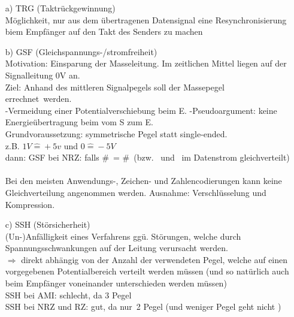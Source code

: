 \documentclass[10pt,a4paper]{scrartcl}
\begin{document}
\begin{enumerate}
	\item[a)] TRG (Taktrückgewinnung)\\
		Möglichkeit, nur aus dem übertragenen Datensignal eine Resynchronisierung biem Empfänger auf den Takt des Senders zu machen
	
	\item[b)] GSF (Gleichspannungs-/stromfreiheit)\\
		Motivation: Einsparung der Masseleitung. Im zeitlichen Mittel liegen auf der Signalleitung 0V an.\\
		Ziel: Anhand des mittleren Signalpegels soll der Massepegel \glqq errechnet\grqq\ werden.\\
		\subitem -Vermeidung einer Potentialverschiebung beim E.
		\subitem -Pseudoargument: keine Energieübertragung beim vom S zum E.\\
		Grundvoraussetzung: symmetrische Pegel statt single-ended. \\
		z.B. $1V \hat{=} +5v$ und $0 \hat{=} -5V$\\
		dann: GSF bei NRZ: falls \#\grqq\ = \#\grqq\ (bzw. \grqq\ und \grqq\ im Datenstrom gleichverteilt)\\\\
		Bei den meisten Anwendungs-, Zeichen- und Zahlencodierungen kann keine Gleichverteilung angenommen werden. Ausnahme: Verschlüsselung und Kompression.
	\item[c)] SSH (Störsicherheit)\\
		(Un-)Anfälligkeit eines Verfahrens ggü. Störungen, welche durch Spannungsschwankungen auf der Leitung verursacht werden.\\
		$\Rightarrow$ direkt abhängig von der Anzahl der verwendeten Pegel, welche auf einen vorgegebenen Potentialbereich verteilt werden müssen (und so natürlich auch beim Empfänger voneinander unterschieden werden müssen)\\
		SSH bei AMI: schlecht, da 3 Pegel\\
		SSH bei NRZ und RZ: gut, da \glqq nur\grqq\ 2 Pegel (und weniger Pegel geht nicht \smiley{})
\end{enumerate}
\end{document}
